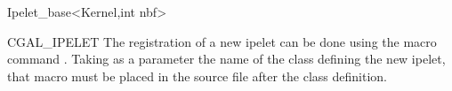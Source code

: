 \begin{ccRefClass}{Ipelet_base<Kernel,int nbf>}
\begin{ccRefMacro}{CGAL_IPELET}
The registration of a new ipelet can be done using the macro command .
Taking as a parameter the name of the class defining the new ipelet, that macro must be placed in the source
file after the class definition. 
\end{ccRefMacro}



\end{ccRefClass}
